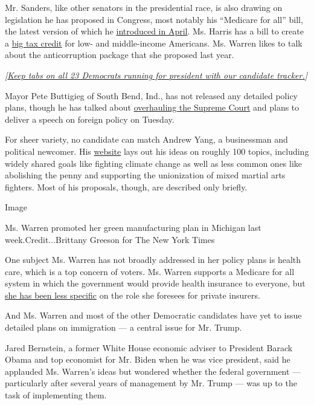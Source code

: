 Mr. Sanders, like other senators in the presidential race, is also
drawing on legislation he has proposed in Congress, most notably his
``Medicare for all'' bill, the latest version of which he
\href{https://www.nytimes.com/2019/04/10/us/politics/bernie-sanders-medicare-for-all.html}{introduced
in April}. Ms. Harris has a bill to create a
\href{https://www.nytimes.com/2019/05/22/business/democrats-taxes-middle-class.html}{big
tax credit} for low- and middle-income Americans. Ms. Warren likes to
talk about the anticorruption package that she proposed last year.

\emph{{[}}\href{https://www.nytimes.com/interactive/2019/us/politics/2020-presidential-candidates.html?action=click\&module=Intentional\&pgtype=Article}{\emph{Keep
tabs on all 23 Democrats running for president with our candidate
tracker.}}\emph{{]}}

Mayor Pete Buttigieg of South Bend, Ind., has not released any detailed
policy plans, though he has talked about
\href{https://www.nbcnews.com/politics/2020-election/inside-pete-buttigieg-s-plan-overhaul-supreme-court-n1012491}{overhauling
the Supreme Court} and plans to deliver a speech on foreign policy on
Tuesday.

For sheer variety, no candidate can match Andrew Yang, a businessman and
political newcomer. His
\href{https://www.yang2020.com/policies/}{website} lays out his ideas on
roughly 100 topics, including widely shared goals like fighting climate
change as well as less common ones like abolishing the penny and
supporting the unionization of mixed martial arts fighters. Most of his
proposals, though, are described only briefly.

Image

Ms. Warren promoted her green manufacturing plan in Michigan last
week.Credit...Brittany Greeson for The New York Times

One subject Ms. Warren has not broadly addressed in her policy plans is
health care, which is a top concern of voters. Ms. Warren supports a
Medicare for all system in which the government would provide health
insurance to everyone, but
\href{https://www.nytimes.com/2019/02/02/us/politics/medicare-for-all-2020.html}{she
has been less specific} on the role she foresees for private insurers.

And Ms. Warren and most of the other Democratic candidates have yet to
issue detailed plans on immigration --- a central issue for Mr. Trump.

Jared Bernstein, a former White House economic adviser to President
Barack Obama and top economist for Mr. Biden when he was vice president,
said he applauded Ms. Warren's ideas but wondered whether the federal
government --- particularly after several years of management by Mr.
Trump --- was up to the task of implementing them.

